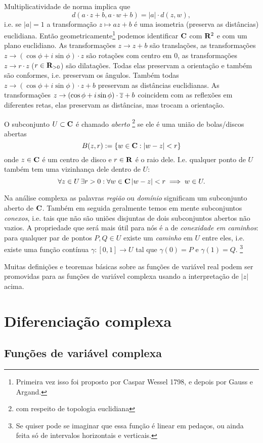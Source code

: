 Multiplicatividade de norma implica que 
\[ d(a\cdot z + b,a\cdot w + b) = |a| \cdot d(z,w), \]
i.e. se $|a|=1$ a transformação $z\mapsto az+b$
é uma isometria (preserva as distâncias) euclidiana.
Então geometricamente\footnote{Primeira vez isso foi proposto por
Caspar Wessel 1798, e depois por Gauss e Argand.}
podemos identificar $\mathbf{C}$ com $\mathbf{R}^2$ e com um plano euclidiano.
As transformações $z \to z + b$ são translações,
as transformações $z \to (\cos \phi + i \sin \phi) \cdot z$ são rotações com centro em $0$,
as transformações $z \to r \cdot z$ ($r\in\mathbf{R}_{>0}$) são dilatações. 
Todas elas preservam a orientação e também são conformes, i.e. preservam os ângulos.
Também todas $z \to (\cos \phi + i \sin \phi) \cdot z + b$ preservam as distâncias euclidianas.
As transformações $z \to (\cos \phi + i \sin \phi) \cdot \overline{z} + b$ coincidem com as reflexões
em diferentes retas, elas preservam as distâncias, mas trocam a orientação.

O subconjunto $U \subset \mathbf{C}$ é chamado \emph{aberto}
\footnote{com respeito de topologia euclidiana}
se ele é uma união de bolas/discos abertas
\[ B(z,r) := \{w\in \mathbf{C} : |w-z|<r \} \]
onde $z\in\mathbf{C}$ é um centro de disco e $r\in\mathbf{R}$ é o raio dele.
I.e. 
qualquer ponto de $U$ também tem uma vizinhança dele dentro de $U$:
\[ \forall z\in U \, \exists r>0 : \forall w\in\mathbf{C} \, |w-z|<r \implies w\in U. \]

Na análise complexa as palavras \emph{região} ou \emph{domínio} significam um subconjunto aberto de $\mathbf{C}$.
Também em seguida geralmente temos em mente subconjuntos \emph{conexos}, i.e. tais
que não são uniões disjuntas de dois subconjuntos abertos não vazios.
A propriedade que será mais útil para nós é a de \emph{conexidade em caminhos}:
para qualquer par de pontos $P,Q\in U$ existe um \emph{caminho} em $U$ entre eles,
i.e. existe uma função contínua $\gamma: [0,1] \to U$ tal que $\gamma(0) = P$
e $\gamma(1)=Q$.
\footnote{Se quiser pode se imaginar que essa função é linear em pedaços,
ou ainda feita só de intervalos horizontais e verticais.}

Muitas definições e teoremas básicas sobre as funções de variável real
podem ser promovidas para as funções de variável complexa usando
a interpretação de $|z|$ acima.

\section{Diferenciação complexa}

\subsection{Funções de variável complexa}

